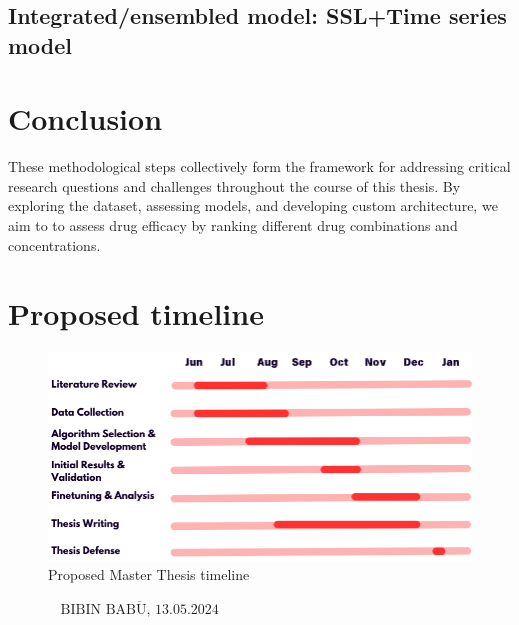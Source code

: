 \documentclass[12pt,twoside,a4paper,parskip]{scrbook} %
\def\BaAuthor{Bibin Babu}
\def\SubmitDate{13.05.2024}
\def\ShowBaAuthor{\BaAuthor}
\def\ShowBaAuthor{BIBIN BABU}
\begin{document}
\section{Integrated/ensembled model: SSL+Time series model}
\chapter{Conclusion}\label{ch:Conclusion}

These methodological steps collectively form the framework for addressing critical research questions and challenges throughout the course of this thesis. By exploring the dataset, assessing models, and developing custom architecture, we aim to to assess drug efficacy by ranking different drug combinations and concentrations.

\let\cleardoublepage\clearpage

\chapter{Proposed timeline}\label{ch:Proposed timeline}

\begin{figure}[H]
    \centering
    \includegraphics[width=0.9\linewidth]{figures/Thesis timeline.png} %
    \caption{Proposed Master Thesis timeline}
    \label{fig:enter-label}
\end{figure}

\FloatBarrier

\printbibliography

\vspace{20pt}
\begin{flushright}
$\overline{~~~~~~~~~~~~~~~~~\mbox{\ShowBaAuthor, \SubmitDate}~~~~~~~~~~~~~~~~~}$
\end{flushright}
\end{document}
